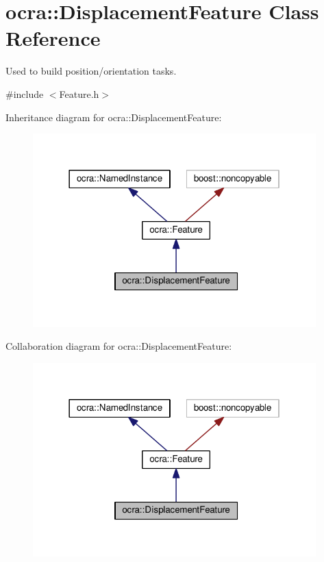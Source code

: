 \hypertarget{classocra_1_1DisplacementFeature}{}\section{ocra\+:\+:Displacement\+Feature Class Reference}
\label{classocra_1_1DisplacementFeature}


Used to build position/orientation tasks.  




{\ttfamily \#include $<$Feature.\+h$>$}



Inheritance diagram for ocra\+:\+:Displacement\+Feature\+:
\nopagebreak
\begin{figure}[H]
\begin{center}
\leavevmode
\includegraphics[width=310pt]{d3/d4f/classocra_1_1DisplacementFeature__inherit__graph}
\end{center}
\end{figure}


Collaboration diagram for ocra\+:\+:Displacement\+Feature\+:
\nopagebreak
\begin{figure}[H]
\begin{center}
\leavevmode
\includegraphics[width=310pt]{da/d53/classocra_1_1DisplacementFeature__coll__graph}
\end{center}
\end{figure}
